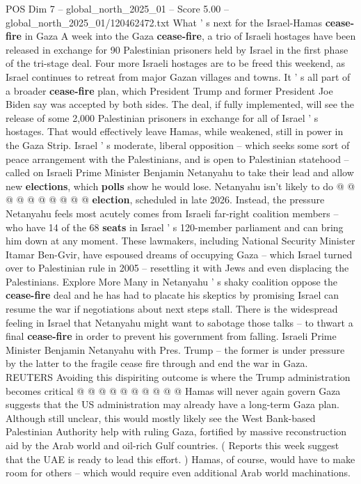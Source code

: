 \begin{textsample}{POS Dim 7 – global\_north\_2025\_01 – Score 5.00 – global\_north\_2025\_01/120462472.txt}  \label{ex:f7_pos_276}
What ' s next for the Israel-Hamas \textbf{cease-fire} in Gaza A week into the Gaza \textbf{cease-fire}, a trio of Israeli hostages have been released in exchange for 90 Palestinian prisoners held by Israel in the first phase of the tri-stage deal.
Four more Israeli hostages are to be freed this weekend, as Israel continues to retreat from major Gazan villages and towns.
It ' s all part of a broader \textbf{cease-fire} plan, which President Trump and former President Joe Biden say was accepted by both sides.
The deal, if fully implemented, will see the release of some 2,000 Palestinian prisoners in exchange for all of Israel ' s hostages.
That would effectively leave Hamas, while weakened, still in power in the Gaza Strip.
Israel ' s moderate, liberal opposition -- which seeks some sort of peace arrangement with the Palestinians, and is open to Palestinian statehood -- called on Israeli Prime Minister Benjamin Netanyahu to take their lead and allow new \textbf{elections}, which \textbf{polls} show he would lose.
Netanyahu isn't likely to do @ @ @ @ @ @ @ @ @ @ \textbf{election}, scheduled in late 2026.
Instead, the pressure Netanyahu feels most acutely comes from Israeli far-right coalition members -- who have 14 of the 68 \textbf{seats} in Israel ' s 120-member parliament and can bring him down at any moment.
These lawmakers, including National Security Minister Itamar Ben-Gvir, have espoused dreams of occupying Gaza -- which Israel turned over to Palestinian rule in 2005 -- resettling it with Jews and even displacing the Palestinians.
Explore More Many in Netanyahu ' s shaky coalition oppose the \textbf{cease-fire} deal and he has had to placate his skeptics by promising Israel can resume the war if negotiations about next steps stall.
There is the widespread feeling in Israel that Netanyahu might want to sabotage those talks -- to thwart a final \textbf{cease-fire} in order to prevent his government from falling.
Israeli Prime Minister Benjamin Netanyahu with Pres.
Trump -- the former is under pressure by the latter to the fragile cease fire through and end the war in Gaza.
REUTERS Avoiding this dispiriting outcome is where the Trump administration becomes critical @ @ @ @ @ @ @ @ @ @ Hamas will never again govern Gaza suggests that the US administration may already have a long-term Gaza plan.
Although still unclear, this would mostly likely see the West Bank-based Palestinian Authority help with ruling Gaza, fortified by massive reconstruction aid by the Arab world and oil-rich Gulf countries. ( Reports this week suggest that the UAE is ready to lead this effort. ) Hamas, of course, would have to make room for others -- which would require even additional Arab world machinations.

\end{textsample}
